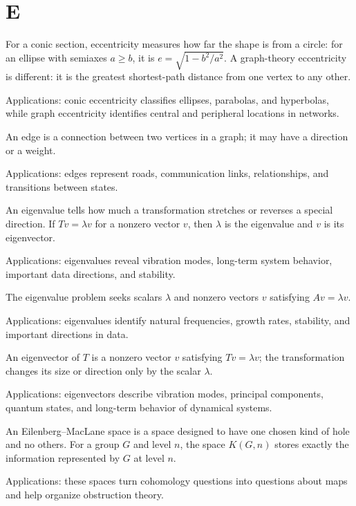 \chapter*{E}
\label{chap:e}

For a conic section, eccentricity measures how far the shape is from a circle: for an ellipse with semiaxes $a\ge b$, it is $e=\sqrt{1-b^2/a^2}$. A graph-theory eccentricity is different: it is the greatest shortest-path distance from one vertex to any other. \par\noindent Applications: conic eccentricity classifies ellipses, parabolas, and hyperbolas, while graph eccentricity identifies central and peripheral locations in networks.

An edge is a connection between two vertices in a graph; it may have a direction or a weight. \par\noindent Applications: edges represent roads, communication links, relationships, and transitions between states.

An eigenvalue tells how much a transformation stretches or reverses a special direction. If $Tv=\lambda v$ for a nonzero vector $v$, then $\lambda$ is the eigenvalue and $v$ is its eigenvector.  \par\noindent Applications: eigenvalues reveal vibration modes, long-term system behavior, important data directions, and stability.

The eigenvalue problem seeks scalars $\lambda$ and nonzero vectors $v$ satisfying $Av=\lambda v$. \par\noindent Applications: eigenvalues identify natural frequencies, growth rates, stability, and important directions in data.

An eigenvector of $T$ is a nonzero vector $v$ satisfying $Tv=\lambda v$; the transformation changes its size or direction only by the scalar $\lambda$. \par\noindent Applications: eigenvectors describe vibration modes, principal components, quantum states, and long-term behavior of dynamical systems.

An Eilenberg--MacLane space is a space designed to have one chosen kind of hole and no others. For a group $G$ and level $n$, the space $K(G,n)$ stores exactly the information represented by $G$ at level $n$.  \par\noindent Applications: these spaces turn cohomology questions into questions about maps and help organize obstruction theory.

